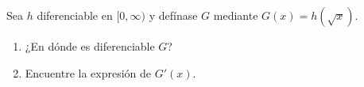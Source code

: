 \item Sea $h$ diferenciable en $[0, \infty)$ y defínase $G$ mediante $G(x) = h(\sqrt{x})$.
\begin{enumerate}
    \item[(a)] ¿En dónde es diferenciable $G$?
    \item[(b)] Encuentre la expresión de $G'(x)$.
\end{enumerate}

